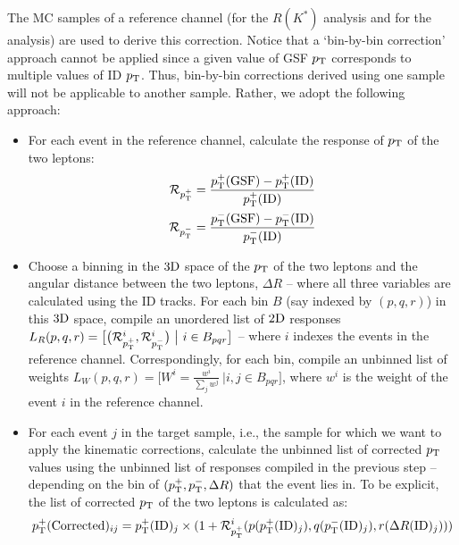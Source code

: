 The MC samples of a reference channel (\BdToKStarJpsi for the $R(K^\ast)$ analysis and \BdToMuMu for the \BdToMuMu analysis) are used to derive this correction. %
Notice that a `bin-by-bin correction' approach cannot be applied since a given value of GSF $p_{\rm T}$ corresponds to multiple values of ID $p_{\rm T}$. %
Thus, bin-by-bin corrections derived using one sample will not be applicable to another sample. %
Rather, we adopt the following approach:
\begin{itemize}
    \item For each event in the reference channel, calculate the response of $p_{\rm T}$ of the two leptons:
    \begin{align}
        \mathcal{R}_{p^+_{\rm T}} &= \frac{p^+_{\rm T}({\rm GSF}) - p^+_{\rm T}({\rm ID})}{p^+_{\rm T}({\rm ID})}\\
        \mathcal{R}_{p^-_{\rm T}} &= \frac{p^-_{\rm T}({\rm GSF}) - p^-_{\rm T}({\rm ID})}{p^-_{\rm T}({\rm ID})}
    \end{align}
    \item Choose a binning in the $3{\rm D}$ space of the $p_{\rm T}$ of the two leptons and the angular distance between the two leptons, $\Delta R$ -- where all three variables are calculated using the {\rm ID} tracks. For each bin $B$ (say indexed by $(p,q,r)$) in this $3{\rm D}$ space, compile an unordered list of $2{\rm D}$ responses $L_R(p,q,r) = \big[\big(\mathcal{R}^{i}_{p^+_{\rm T}}, \mathcal{R}^{i}_{p^-_{\rm T}}\big)\ \big\vert\  i\in B_{pqr}\big]$ -- where $i$ indexes the events in the reference channel. Correspondingly, for each bin, compile an unbinned list of weights $L_W(p,q,r)=\big[W^i=\frac{w^i}{\sum_j w^j}\ \big\vert i,j\in B_{pqr}\big]$, where $w^i$ is the weight of the event $i$ in the reference channel. 
    \item For each event $j$ in the target sample, i.e., the sample for which we want to apply the kinematic corrections, calculate the unbinned list of corrected $p_{\rm T}$ values using the unbinned list of responses compiled in the previous step -- depending on the bin of $(p^+_{\rm T}, p^-_{\rm T}, \Delta R)$ that the event lies in. To be explicit, the list of corrected $p_{\rm T}$ of the two leptons is calculated as:
    \begin{align}
        p^+_{\rm T}({\rm Corrected})_{ij} &= p^+_{\rm T}({\rm ID})_j \times (1 + \mathcal{R}^{i}_{p^+_{\rm T}}(p(p^+_{\rm T}({\rm ID})_j),q(p^-_{\rm T}({\rm ID})_j),r(\Delta R({\rm ID})_j)))\\

\end{align}
\end{itemize}
